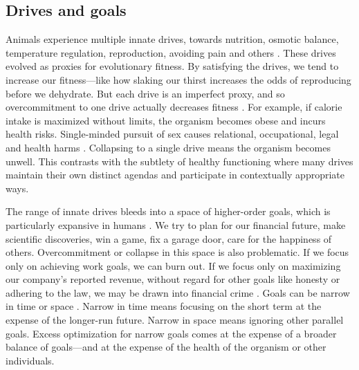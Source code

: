 \documentclass[11pt]{article}
\begin{document}
\subsection{Drives and goals}


Animals experience multiple innate drives, towards nutrition, osmotic balance, temperature regulation, reproduction, avoiding pain and others \citep{saper2014hypothalamus, schulkin2019allostasis, sewards2003representations}. These drives evolved as proxies for evolutionary fitness. By satisfying the drives, we tend to increase our fitness---like how slaking our thirst increases the odds of reproducing before we dehydrate. But each drive is an imperfect proxy, and so overcommitment to one drive actually decreases fitness \citep{kurthnelson2024dynamic,john2023dead, williams1966adaptation, tooby1992psychological}. For example, if calorie intake is maximized without limits, the organism becomes obese and incurs health risks. Single-minded pursuit of sex causes relational, occupational, legal and health harms \citep{kraus2016should, carnes2001out}. Collapsing to a single drive means the organism becomes unwell. This contrasts with the subtlety of healthy functioning where many drives maintain their own distinct agendas and participate in contextually appropriate ways.

The range of innate drives bleeds into a space of higher-order goals, which is particularly expansive in humans \citep{maslow1943theory, miller1960plans, miller2001integrative, vallacher1987people, balleine2007role, cardinal2002emotion, frank2006anatomy, saunders2012role, o2014goal, schank1977scripts}. We try to plan for our financial future, make scientific discoveries, win a game, fix a garage door, care for the happiness of others. Overcommitment or collapse in this space is also problematic. If we focus only on achieving work goals, we can burn out. If we focus only on maximizing our company's reported revenue, without regard for other goals like honesty or adhering to the law, we may be drawn into financial crime \citep{campbell1979assessing, ordonez2009goals, kerr1975folly, burns2006impact}. Goals can be narrow in time or space \citep{ballard2018pursuit, vallacher1987people, shah2002forgetting, evenden1999varieties}. Narrow in time means focusing on the short term at the expense of the longer-run future. Narrow in space means ignoring other parallel goals. Excess optimization for narrow goals comes at the expense of a broader balance of goals---and at the expense of the health of the organism or other individuals.
\end{document}
